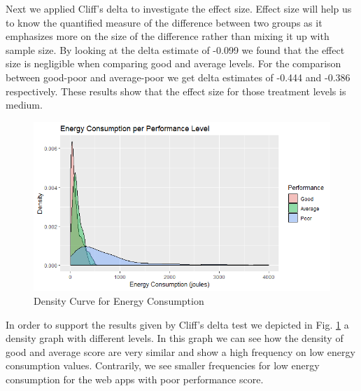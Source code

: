 Next we applied Cliff's delta to investigate the effect size. Effect size will help us to know the quantified measure of the difference between two groups as it emphasizes more on the size of the difference rather than mixing it up with sample size. By looking at the delta estimate of -0.099  we found that the effect size is negligible when comparing good and average levels. For the comparison between good-poor and average-poor we get delta estimates of -0.444 and -0.386 respectively. These results show that the effect size for those treatment levels is medium.

\begin{figure}[H]
  \includegraphics[width=\linewidth]{./NewImages/Fig_11_Density_Curve_Energy_Consumption.png}
  \caption{Density Curve for Energy Consumption}
  \label{fig:density-levels}
\end{figure}

In order to support the results given by Cliff's delta test we depicted in Fig. \ref{fig:density-levels} a density graph with different levels. In this graph we can see how the density of good and average score are very similar and show a high frequency on low energy consumption values. Contrarily, we see smaller frequencies for low energy consumption for the web apps with poor performance score.






